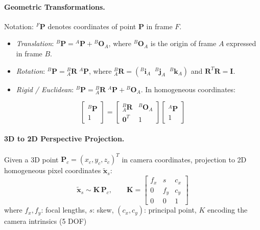 \documentclass{article}
\begin{document}
\paragraph{Geometric Transformations.}
Notation: ${}^{F}\mathbf{P}$ denotes coordinates of point $\mathbf{P}$ in frame $F$.
\begin{itemize}
    \item \textit{Translation}: ${}^{B}\mathbf{P} = {}^{A}\mathbf{P} + {}^{B}\mathbf{O}_A$, where ${}^{B}\mathbf{O}_A$ is the origin of frame $A$ expressed in frame $B$.
    \item \textit{Rotation}: ${}^{B}\mathbf{P} = {}^{B}_{A}\mathbf{R}\;{}^{A}\mathbf{P}$, where ${}^{B}_{A}\mathbf{R} = ({}^{B}\mathbf{i}_A \;\; {}^{B}\mathbf{j}_A \;\; {}^{B}\mathbf{k}_A)$ and $\mathbf{R}^T\mathbf{R} = \mathbf{I}$.
    \item \textit{Rigid / Euclidean}: ${}^{B}\mathbf{P} = {}^{B}_{A}\mathbf{R}\;{}^{A}\mathbf{P} + {}^{B}\mathbf{O}_A$. In homogeneous coordinates:
\end{itemize}
\begin{equation*}
    \begin{bmatrix} {}^{B}\mathbf{P} \\ 1 \end{bmatrix}
    = \begin{bmatrix} {}^{B}_{A}\mathbf{R} & {}^{B}\mathbf{O}_A \\ \mathbf{0}^T & 1 \end{bmatrix}
    \begin{bmatrix} {}^{A}\mathbf{P} \\ 1 \end{bmatrix}
\end{equation*}

\paragraph{3D to 2D Perspective Projection.}
Given a 3D point $\mathbf{P}_c = (x_c, y_c, z_c)^T$ in camera coordinates, projection to 2D homogeneous pixel coordinates $\tilde{\mathbf{x}}_s$:
\begin{equation*}
    \tilde{\mathbf{x}}_s \sim \mathbf{K}\, \mathbf{P}_c, \qquad
    \mathbf{K} = \begin{bmatrix} f_x & s & c_x \\ 0 & f_y & c_y \\ 0 & 0 & 1 \end{bmatrix}
\end{equation*}
where $f_x, f_y$: focal lengths, $s$: skew, $(c_x, c_y)$: principal point, $K$ encoding the camera intrinsics (5 DOF)\\
 
\end{document}
